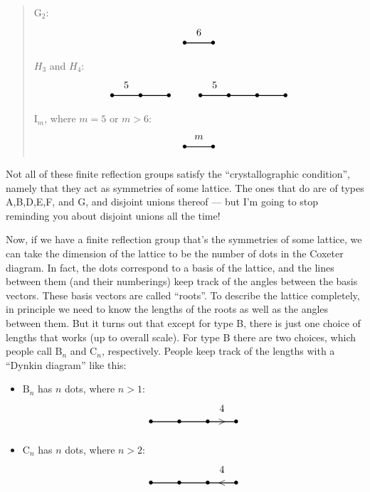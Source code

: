 \documentclass{article}
\def\tightlist{}
\begin{document}
\begin{quote}
\[\] \(\mathrm{G}_2\): \[
  \begin{tikzpicture}
    \draw[thick] (0,0) node{$\bullet$} to node[label=above:{6}]{} (1,0) node{$\bullet$};
  \end{tikzpicture}
\] \(H_3\) and \(H_4\): \[
  \begin{tikzpicture}
    \draw[thick] (0,0) node{$\bullet$} to node[label=above:{5}]{} (1,0) node{$\bullet$} to (2,0) node{$\bullet$};
  \end{tikzpicture}
  \qquad
  \begin{tikzpicture}
  \draw[thick] (0,0) node{$\bullet$} to node[label=above:{5}]{} (1,0) node{$\bullet$} to (2,0) node{$\bullet$} to (3,0) node {$\bullet$};
\end{tikzpicture}
\] \(\mathrm{I}_m\), where \(m = 5\) or \(m > 6\): \[
  \begin{tikzpicture}
    \draw[thick] (0,0) node{$\bullet$} to node[label=above:{$m$}]{} (1,0) node{$\bullet$};
  \end{tikzpicture}
\]
\end{quote}

Not all of these finite reflection groups satisfy the ``crystallographic
condition'', namely that they act as symmetries of some lattice. The
ones that do are of types A,B,D,E,F, and G, and disjoint unions thereof
--- but I'm going to stop reminding you about disjoint unions all the
time!

Now, if we have a finite reflection group that's the symmetries of some
lattice, we can take the dimension of the lattice to be the number of
dots in the Coxeter diagram. In fact, the dots correspond to a basis of
the lattice, and the lines between them (and their numberings) keep
track of the angles between the basis vectors. These basis vectors are
called ``roots''. To describe the lattice completely, in principle we
need to know the lengths of the roots as well as the angles between
them. But it turns out that except for type B, there is just one choice
of lengths that works (up to overall scale). For type B there are two
choices, which people call \(\mathrm{B}_n\) and \(\mathrm{C}_n\),
respectively. People keep track of the lengths with a ``Dynkin diagram''
like this:

\begin{itemize}
\tightlist
\item
  \(\mathrm{B}_n\) has \(n\) dots, where \(n>1\): \[
      \begin{tikzpicture}
        \draw[thick] (0,0) node{$\bullet$} to (1,0) node{$\bullet$} to (2,0) node{$\bullet$} to node[label=above:{4}]{\textgreater} (3,0) node {$\bullet$};
      \end{tikzpicture}
    \]
\item
  \(\mathrm{C}_n\) has \(n\) dots, where \(n>2\): \[
      \begin{tikzpicture}
        \draw[thick] (0,0) node{$\bullet$} to (1,0) node{$\bullet$} to (2,0) node{$\bullet$} to node[label=above:{4}]{\textless} (3,0) node {$\bullet$};
      \end{tikzpicture}
    \]
\end{itemize}
\end{document}
